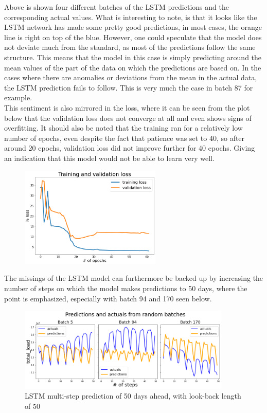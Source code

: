 \documentclass[main.tex]{subfiles}
\begin{document}
Above is shown four different batches of the LSTM predictions and the corresponding actual values. What is interesting to note, is that it looks like the LSTM network has made some pretty good predictions, in most cases, the orange line is right on top of the blue. However, one could speculate that the model does not deviate much from the standard, as most of the predictions follow the same structure. This means that the model in this case is simply predicting around the mean values of the part of the data on which the predictions are based on. In the cases where there are anomalies or deviations from the mean in the actual data, the LSTM prediction fails to follow. This is very much the case in batch 87 for example.\\
This sentiment is also mirrored in the loss, where it can be seen from the plot below that the validation loss does not converge at all and even shows signs of overfitting. It should also be noted that the training ran for a relatively low number of epochs, even despite the fact that patience was set to 40, so after around 20 epochs, validation loss did not improve further for 40 epochs. Giving an indication that this model would not be able to learn very well.

\begin{figure}[H]
\centering
\includegraphics[width=0.6\textwidth]{RNNPlots/lstmloss25day.png}
\caption{}
\label{fig:lstm_loss_1}
\end{figure}

The missings of the LSTM model can furthermore be backed up by increasing the number of steps on which the model makes predictions to 50 days, where the point is emphasized, especially with batch 94 and 170 seen below.

\begin{figure}[H]
\centering
\includegraphics[width=0.9\textwidth]{RNNPlots/lstmpredictionsbad2.png}
\caption{LSTM multi-step prediction of 50 days ahead, with look-back length of 50}
\label{fig:lstm_preds_2}
\end{figure}
\end{document}
